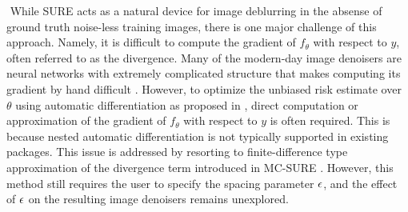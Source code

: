 $ $\newline
While SURE acts as a natural device for image deblurring in the absense of ground truth noise-less training images, there is one major challenge of this approach. Namely, it is difficult to compute the gradient of $f_\theta$ with respect to $y$, often referred to as the divergence. Many of the modern-day image denoisers are neural networks with extremely complicated structure that makes computing its gradient by hand difficult \citep{zhang2017beyond,yang2017high,dong2014learning}. However, to optimize the unbiased risk estimate over $\theta$ using automatic differentiation as proposed in \citet{metzler2018unsupervised}, direct computation or approximation of the gradient of $f_\theta$ with respect to $y$ is often required. This is because nested automatic differentiation is not typically supported in existing packages. This issue is addressed by resorting to finite-difference type approximation of the divergence term introduced in MC-SURE \citep{ramani2008monte}. However, this method still requires the user to specify the spacing parameter $\epsilon$, and the effect of $\epsilon$ on the resulting image denoisers remains unexplored.








